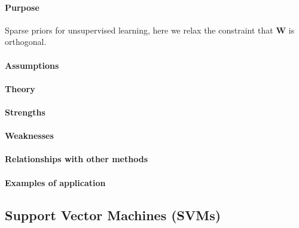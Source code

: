 \paragraph{Purpose}
Sparse priors for unsupervised learning, here we relax the constraint that $\bm{W}$
is orthogonal. 
\paragraph{Assumptions}
\paragraph{Theory}
\paragraph{Strengths}
\paragraph{Weaknesses}
\paragraph{Relationships with other methods}
\paragraph{Examples of application}

\subsection{Support Vector Machines (SVMs)}
